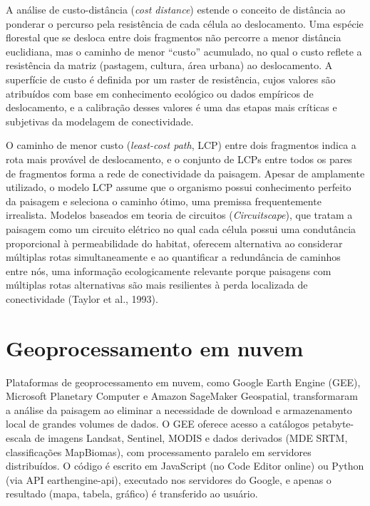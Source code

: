 \documentclass[
  portuguese,
  11pt,
  a4paper,
  open=any]{scrbook}
\begin{document}
A análise de custo-distância (\emph{cost distance}) estende o conceito
de distância ao ponderar o percurso pela resistência de cada célula ao
deslocamento. Uma espécie florestal que se desloca entre dois fragmentos
não percorre a menor distância euclidiana, mas o caminho de menor
``custo'' acumulado, no qual o custo reflete a resistência da matriz
(pastagem, cultura, área urbana) ao deslocamento. A superfície de custo
é definida por um raster de resistência, cujos valores são atribuídos
com base em conhecimento ecológico ou dados empíricos de deslocamento, e
a calibração desses valores é uma das etapas mais críticas e subjetivas
da modelagem de conectividade.

O caminho de menor custo (\emph{least-cost path}, LCP) entre dois
fragmentos indica a rota mais provável de deslocamento, e o conjunto de
LCPs entre todos os pares de fragmentos forma a rede de conectividade da
paisagem. Apesar de amplamente utilizado, o modelo LCP assume que o
organismo possui conhecimento perfeito da paisagem e seleciona o caminho
ótimo, uma premissa frequentemente irrealista. Modelos baseados em
teoria de circuitos (\emph{Circuitscape}), que tratam a paisagem como um
circuito elétrico no qual cada célula possui uma condutância
proporcional à permeabilidade do habitat, oferecem alternativa ao
considerar múltiplas rotas simultaneamente e ao quantificar a
redundância de caminhos entre nós, uma informação ecologicamente
relevante porque paisagens com múltiplas rotas alternativas são mais
resilientes à perda localizada de conectividade (Taylor et al., 1993).

\section{Geoprocessamento em nuvem}\label{geoprocessamento-em-nuvem}

Plataformas de geoprocessamento em nuvem, como Google Earth Engine
(GEE), Microsoft Planetary Computer e Amazon SageMaker Geospatial,
transformaram a análise da paisagem ao eliminar a necessidade de
download e armazenamento local de grandes volumes de dados. O GEE
oferece acesso a catálogos petabyte-escala de imagens Landsat, Sentinel,
MODIS e dados derivados (MDE SRTM, classificações MapBiomas), com
processamento paralelo em servidores distribuídos. O código é escrito em
JavaScript (no Code Editor online) ou Python (via API earthengine-api),
executado nos servidores do Google, e apenas o resultado (mapa, tabela,
gráfico) é transferido ao usuário.
\end{document}

